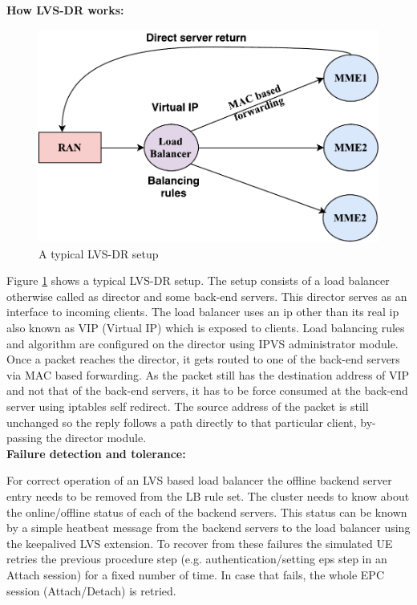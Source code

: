 \documentclass[hidelinks]{report}
\begin{document}
\noindent\textbf{How LVS-DR works:}
\begin{figure}[H]	
\centering
\includegraphics[scale= 0.65]{images/lvs.pdf}
\caption{A typical LVS-DR setup}
\label{fig:lbi}
\end{figure}
Figure \ref{fig:lbi} shows a typical LVS-DR setup. The setup consists of a load balancer otherwise called as director and some back-end servers. This director serves as an interface to incoming clients. The load balancer uses an ip other than its real ip also known as VIP (Virtual IP) which is exposed to clients. Load balancing rules and algorithm are configured on the director using IPVS administrator module. Once a packet reaches the director, it gets routed to one of the back-end servers via MAC based forwarding. As the packet still has the destination address of VIP and not that of the back-end servers, it has to be force consumed at the back-end server using iptables self redirect. The source address of the packet is still unchanged so the reply follows a path directly to that particular client, by-passing the director module.\\


\noindent\textbf{Failure detection and tolerance:}

For correct operation of an LVS based load balancer the offline backend server entry needs to be removed from the LB rule set. The cluster needs to know about the  online/offline status of each of the backend servers. This status can be known by a simple heatbeat message from the backend servers to the load balancer using the keepalived LVS extension. To recover from these failures the simulated UE retries the previous procedure step (e.g. authentication/setting eps step in an Attach session) for a fixed number of time. In case that fails, the whole EPC session (Attach/Detach) is retried. 
\end{document}
